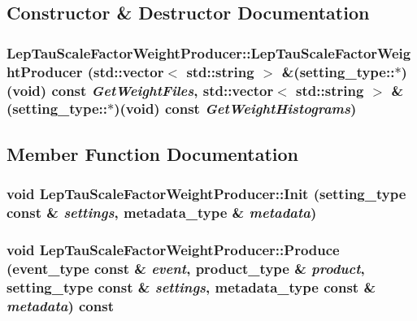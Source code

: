 \subsection{Constructor \& Destructor Documentation}
\hypertarget{classLepTauScaleFactorWeightProducer_a026aa4adc7d6d3368561d3fa1293497d}{
\subsubsection[{LepTauScaleFactorWeightProducer}]{\setlength{\rightskip}{0pt plus 5cm}LepTauScaleFactorWeightProducer::LepTauScaleFactorWeightProducer (std::vector$<$ std::string $>$ \&(setting\_\-type::$\ast$)(void) const  {\em GetWeightFiles}, \/  std::vector$<$ std::string $>$ \&(setting\_\-type::$\ast$)(void) const  {\em GetWeightHistograms})}}
\label{classLepTauScaleFactorWeightProducer_a026aa4adc7d6d3368561d3fa1293497d}


\subsection{Member Function Documentation}
\hypertarget{classLepTauScaleFactorWeightProducer_af9c92a38f08410dcd75fff6fc5b90312}{
\subsubsection[{Init}]{\setlength{\rightskip}{0pt plus 5cm}void LepTauScaleFactorWeightProducer::Init (setting\_\-type const \& {\em settings}, \/  metadata\_\-type \& {\em metadata})}}
\label{classLepTauScaleFactorWeightProducer_af9c92a38f08410dcd75fff6fc5b90312}
\hypertarget{classLepTauScaleFactorWeightProducer_a576db6816f86e20dba770796d0b24cff}{
\subsubsection[{Produce}]{\setlength{\rightskip}{0pt plus 5cm}void LepTauScaleFactorWeightProducer::Produce (event\_\-type const \& {\em event}, \/  product\_\-type \& {\em product}, \/  setting\_\-type const \& {\em settings}, \/  metadata\_\-type const \& {\em metadata}) const}}
\label{classLepTauScaleFactorWeightProducer_a576db6816f86e20dba770796d0b24cff}



